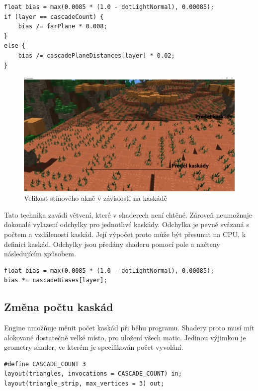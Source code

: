 \documentclass[thesis=M,czech]{FITthesis}[2019/12/23]
\begin{document}
\begin{verbatim}
float bias = max(0.0085 * (1.0 - dotLightNormal), 0.00085);
if (layer == cascadeCount) {
    bias /= farPlane * 0.008;
}
else {
    bias /= cascadePlaneDistances[layer] * 0.02;
}
\end{verbatim}

\begin{figure}\centering
	\includegraphics[width=\textwidth]{images/shadows/csm_acne}
	\caption[Velikost stínového akné v závislosti na kaskádě]{Velikost stínového akné v závislosti na kaskádě}\label{fig:shadows_csm_acne}
\end{figure}

Tato technika zavádí větvení, které v shaderech není chtěné. Zároveň neumožnuje dokonalé vylazení odchylky pro jednotlivé kaskády. Odchylka je pevně svázaná s počtem a vzdáleností kaskád. Její výpočet proto může být přesunut na CPU, k definici kaskád. Odchylky jsou předány shaderu pomocí pole a načteny následujícím způsobem.

\begin{verbatim}
float bias = max(0.0085 * (1.0 - dotLightNormal), 0.00085);
bias *= cascadeBiases[layer];
\end{verbatim}

\subsection{Změna počtu kaskád}

Engine umožňuje měnit počet kaskád při běhu programu. Shadery proto musí mít alokované dostatečně velké místo, pro uložení všech matic. Jedinou vý\-jim\-kou je geometry shader, ve kterém je specifikován počet vyvolání.

\begin{verbatim}
#define CASCADE_COUNT 3
layout(triangles, invocations = CASCADE_COUNT) in;
layout(triangle_strip, max_vertices = 3) out;
\end{verbatim}
\end{document}

